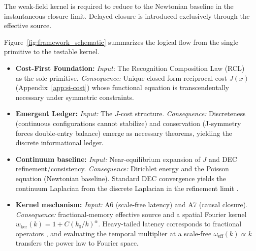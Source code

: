 \documentclass[entropy,article,submit,pdftex,moreauthors]{Definitions/mdpi}
\begin{document}
The weak-field kernel is required to reduce to the Newtonian baseline in the instantaneous-closure limit. Delayed closure is introduced exclusively through the effective source.

Figure~\ref{fig:framework_schematic} summarizes the logical flow from the single primitive to the testable kernel.
\begin{itemize}[itemsep=2pt]
  \item \textbf{Cost-First Foundation:} \textit{Input:} The Recognition Composition Law (RCL) as the sole primitive. \textit{Consequence:} Unique closed-form reciprocal cost \(J(x)\) (Appendix~\ref{app:si-cost}) whose functional equation is transcendentally necessary under symmetric constraints.
  \item \textbf{Emergent Ledger:} \textit{Input:} The \(J\)-cost structure. \textit{Consequence:} Discreteness (continuous configurations cannot stabilize) and conservation (J-symmetry forces double-entry balance) emerge as necessary theorems, yielding the discrete informational ledger.
  \item \textbf{Continuum baseline:} \textit{Input:} Near-equilibrium expansion of \(J\) and DEC refinement/consistency. \textit{Consequence:} Dirichlet energy and the Poisson equation (Newtonian baseline). Standard DEC convergence yields the continuum Laplacian from the discrete Laplacian in the refinement limit \cite{bossavit1998,hirani2003,desbrun2005}.
  \item \textbf{Kernel mechanism:} \textit{Input:} A6 (scale-free latency) and A7 (causal closure). \textit{Consequence:} fractional-memory effective source and a spatial Fourier kernel \(w_{\mathrm{ker}}(k)=1+C(k_0/k)^\alpha\). Heavy-tailed latency corresponds to fractional operators \cite{MetzlerKlafter2000,Mainardi2010}, and evaluating the temporal multiplier at a scale-free \(\omega_{\mathrm{eff}}(k)\propto k\) transfers the power law to Fourier space.
\end{itemize}
\end{document}
